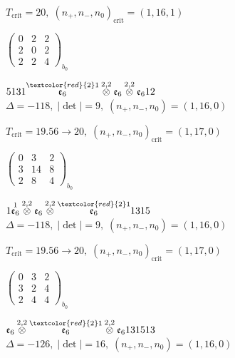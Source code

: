 \documentclass[10pt]{article}
\begin{document}
\hspace{1em}$T_{\text{crit}}=20,\; (n_+,n_-,n_0)_{\text{crit}}=(1,16,1)$

\hspace{2em}$\left(\begin{smallmatrix}0 & 2 & 2 \\ 2 & 0 & 2 \\ 2 & 2 & 4\end{smallmatrix}\right)_{\!b_0}$

$5131\overset{\textcolor{red}{2}1}{\mathfrak{e}_6}\overset{2,2}{\otimes}\mathfrak{e}_6\overset{2,2}{\otimes}\mathfrak{e}_612$ \quad $\Delta=-118,\; |\det|=9,\; (n_+,n_-,n_0)=(1,16,0)$

\hspace{1em}$T_{\text{crit}}=19.56 \to 20,\; (n_+,n_-,n_0)_{\text{crit}}=(1,17,0)$

\hspace{2em}$\left(\begin{smallmatrix}0 & 3 & 2 \\ 3 & 14 & 8 \\ 2 & 8 & 4\end{smallmatrix}\right)_{\!b_0}$

\smallskip

$1\overset{1}{\mathfrak{e}_6}\overset{2,2}{\otimes}\mathfrak{e}_6\overset{2,2}{\otimes}\overset{\textcolor{red}{2}1}{\mathfrak{e}_6}1315$ \quad $\Delta=-118,\; |\det|=9,\; (n_+,n_-,n_0)=(1,16,0)$

\hspace{1em}$T_{\text{crit}}=19.56 \to 20,\; (n_+,n_-,n_0)_{\text{crit}}=(1,17,0)$

\hspace{2em}$\left(\begin{smallmatrix}0 & 3 & 2 \\ 3 & 2 & 4 \\ 2 & 4 & 4\end{smallmatrix}\right)_{\!b_0}$

\smallskip

$\mathfrak{e}_6\overset{2,2}{\otimes}\overset{\textcolor{red}{2}1}{\mathfrak{e}_6}\overset{2,2}{\otimes}\mathfrak{e}_6131513$ \quad $\Delta=-126,\; |\det|=16,\; (n_+,n_-,n_0)=(1,16,0)$
\end{document}
